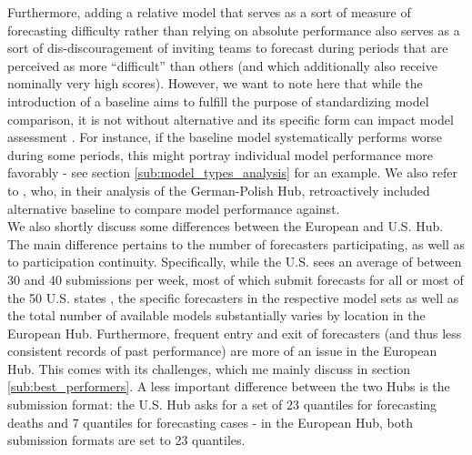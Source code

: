 Furthermore, adding a relative model that serves as a sort of measure of forecasting difficulty rather than relying on absolute performance also serves as a sort of dis-discouragement of inviting teams to forecast during periods that are perceived as more ``difficult'' than others (and which additionally also receive nominally very high scores). However, we want to note here that while the introduction of a baseline aims to fulfill the purpose of standardizing model comparison, it is not without alternative and its specific form can imp{}act model assessment \citep{sherratt_predictive_2022}. For instance, if the baseline model systematically performs worse during some periods, this might portray individual model performance more favorably - see section \ref{sub:model_types_analysis} for an example. We also refer to \cite{bracher_pre-registered_2021}, who, in their analysis of the German-Polish Hub, retroactively included alternative baseline to compare model performance against.\\
We also shortly discuss some differences between the European and U.S. Hub. The main difference pertains to the number of forecasters participating, as well as to participation continuity. Specifically, while the U.S. sees an average of between 30 and 40 submissions per week, most of which submit forecasts for all or most of the 50 U.S. states \citep{ray_comparing_2022}, the specific forecasters in the respective model sets as well as the total number of available models substantially varies by location in the European Hub. Furthermore, frequent entry and exit of forecasters (and thus less consistent records of past performance) are more of an issue in the European Hub. This comes with its challenges, which me mainly discuss in section \ref{sub:best_performers}. A less important difference between the two Hubs is the submission format: the U.S. Hub asks for a set of 23 quantiles for forecasting deaths and 7 quantiles for forecasting cases - in the European Hub, both submission formats are set to 23 quantiles.\\

